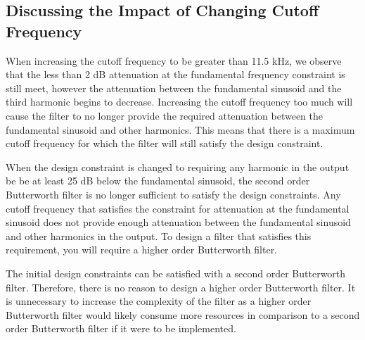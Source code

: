 \documentclass[12pt]{article}
\begin{document}
\subsection*{Discussing the Impact of Changing Cutoff Frequency}
When increasing the cutoff frequency to be greater than 11.5 kHz, we observe that the less than 2 dB attenuation at the fundamental frequency constraint is still meet, however the attenuation between the fundamental sinusoid and the third harmonic begins to decrease. Increasing the cutoff frequency too much will cause the filter to no longer provide the required attenuation between the fundamental sinusoid and other harmonics. This means that there is a maximum cutoff frequency for which the filter will still satisfy the design constraint.

When the design constraint is changed to requiring any harmonic in the output be be at least 25 dB below the fundamental sinusoid, the second order Butterworth filter is no longer sufficient to satisfy the design constraints. Any cutoff frequency that satisfies the constraint for attenuation at the fundamental sinusoid does not provide enough attenuation between the fundamental sinusoid and other harmonics in the output. To design a filter that satisfies this requirement, you will require a higher order Butterworth filter.

The initial design constraints can be satisfied with a second order Butterworth filter. Therefore, there is no reason to design a higher order Butterworth filter. It is unnecessary to increase the complexity of the filter as a higher order Butterworth filter would likely consume more resources in comparison to a second order Butterworth filter if it were to be implemented.

\end{document}
